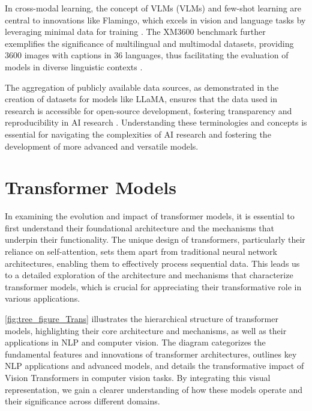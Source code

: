 In cross-modal learning, the concept of VLMs (VLMs) and few-shot learning are central to innovations like Flamingo, which excels in vision and language tasks by leveraging minimal data for training \cite{alayrac2022flamingo}. The XM3600 benchmark further exemplifies the significance of multilingual and multimodal datasets, providing 3600 images with captions in 36 languages, thus facilitating the evaluation of models in diverse linguistic contexts \cite{thapliyal2022crossmodal3600massivelymultilingualmultimodal}.



The aggregation of publicly available data sources, as demonstrated in the creation of datasets for models like LLaMA, ensures that the data used in research is accessible for open-source development, fostering transparency and reproducibility in AI research \cite{touvron2023llama}. Understanding these terminologies and concepts is essential for navigating the complexities of AI research and fostering the development of more advanced and versatile models.







\section{Transformer Models} \label{sec:Transformer Models}


In examining the evolution and impact of transformer models, it is essential to first understand their foundational architecture and the mechanisms that underpin their functionality. The unique design of transformers, particularly their reliance on self-attention, sets them apart from traditional neural network architectures, enabling them to effectively process sequential data. This leads us to a detailed exploration of the architecture and mechanisms that characterize transformer models, which is crucial for appreciating their transformative role in various applications. 

\autoref{fig:tree_figure_Trans} illustrates the hierarchical structure of transformer models, highlighting their core architecture and mechanisms, as well as their applications in NLP and computer vision. The diagram categorizes the fundamental features and innovations of transformer architectures, outlines key NLP applications and advanced models, and details the transformative impact of Vision Transformers in computer vision tasks. By integrating this visual representation, we gain a clearer understanding of how these models operate and their significance across different domains.

